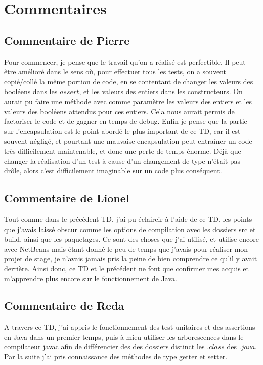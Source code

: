 \documentclass[a4paper,11pts]{article}
\begin{document}
\section{Commentaires}
\subsection{Commentaire de Pierre}
Pour commencer, je pense que le travail qu'on a réalisé est perfectible. Il peut être amélioré dans le sens où, pour effectuer tous les tests, on a souvent copié/collé la même portion de code, en se contentant de changer les valeurs des booléens dans les $assert$, et les valeurs des entiers dans les constructeurs. On aurait pu faire une méthode avec comme paramètre les valeurs des entiers et les valeurs des booléens attendus pour ces entiers. Cela nous aurait permis de factoriser le code et de gagner en temps de debug. Enfin je pense que la partie sur l'encapsulation est le point abordé le plus important de ce TD, car il est souvent négligé, et pourtant une mauvaise encapsulation peut entraîner un code très difficilement maintenable, et donc une perte de temps énorme. Déjà que changer la réalisation d'un test à cause d'un changement de type n'était pas drôle, alors c'est difficilement imaginable sur un code plus conséquent.

\subsection{Commentaire de Lionel}
Tout comme dans le précédent TD, j'ai pu éclaircir à l'aide de ce TD, les points que j'avais laissé obscur comme les options de compilation avec les dossiers src et build, ainsi que les paquetages. Ce sont des choses que j'ai utilisé, et utilise encore avec NetBeans mais étant donné le peu de temps que j'avais pour réaliser mon projet de stage, je n'avais jamais pris la peine de bien comprendre ce qu'il y avait derrière. Ainsi donc, ce TD et le précédent ne font que confirmer mes acquis et m'apprendre plus encore sur le fonctionnement de Java.

\subsection{Commentaire de Reda}
A travers ce TD, j'ai appris le fonctionnement des test unitaires et des assertions en Java dans un premier temps, puis à mieu utiliser les arborescences dans le compilateur javac afin de différencier des des dossiers distinct les $.class$ des $.java$. Par la suite j'ai pris connaissance des méthodes de type getter et setter.
\end{document}
